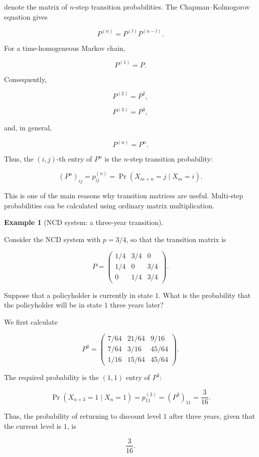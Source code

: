 \documentclass[
  letterpaper,
  DIV=11,
  numbers=noendperiod]{scrartcl}
\theoremstyle{definition}
\newtheorem{example}{Example}[section]
\theoremstyle{remark}
\begin{document}
denote the matrix of \(n\)-step transition probabilities. The
Chapman--Kolmogorov equation gives

\[
P^{(n)}
=
P^{(l)}P^{(n-l)}.
\]

For a time-homogeneous Markov chain,

\[
P^{(1)}=P.
\]

Consequently,

\[
P^{(2)}=P^2,
\]

\[
P^{(3)}=P^3,
\]

and, in general,

\[
\boxed{
P^{(n)}=P^n.
}
\]

Thus, the \((i,j)\)-th entry of \(P^n\) is the \(n\)-step transition
probability:

\[
\boxed{
(P^n)_{ij}
=
p_{ij}^{(n)}
=
\Pr(X_{m+n}=j\mid X_m=i).
}
\]

This is one of the main reasons why transition matrices are useful.
Multi-step probabilities can be calculated using ordinary matrix
multiplication.

\begin{example}[NCD system: a three-year
transition]\protect\hypertarget{exm-ncd}{}\label{exm-ncd}

Consider the NCD system with \(p=3/4\), so that the transition matrix is

\[
P=
\begin{pmatrix}
1/4 & 3/4 & 0\\
1/4 & 0 & 3/4\\
0 & 1/4 & 3/4
\end{pmatrix}.
\]

Suppose that a policyholder is currently in state \(1\). What is the
probability that the policyholder will be in state \(1\) three years
later?

We first calculate

\[
P^3
=
\begin{pmatrix}
7/64 & 21/64 & 9/16\\
7/64 & 3/16 & 45/64\\
1/16 & 15/64 & 45/64
\end{pmatrix}.
\]

The required probability is the \((1,1)\) entry of \(P^3\):

\[
\Pr(X_{n+3}=1\mid X_n=1)
=
p_{11}^{(3)}
=
(P^3)_{11}
=
\frac{3}{16}.
\]

Thus, the probability of returning to discount level \(1\) after three
years, given that the current level is \(1\), is

\[
\boxed{\frac{3}{16}}.
\]

\end{example}
\end{document}
